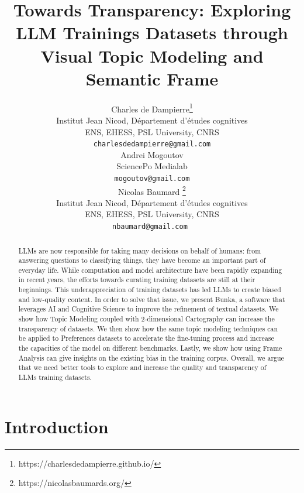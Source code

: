 \documentclass{article}
\title{Towards Transparency: Exploring LLM Trainings Datasets through Visual Topic Modeling and Semantic Frame}
\author{%
  Charles de Dampierre\thanks{https://charlesdedampierre.github.io/} \\
  Institut Jean Nicod, Département d’études cognitives\\
  ENS, EHESS, PSL University, CNRS\\
  \texttt{charlesdedampierre@gmail.com} \\
  \And
Andrei Mogoutov\\
 SciencePo Medialab\\
  \texttt{mogoutov@gmail.com} \\
  \AND
 Nicolas Baumard
\thanks{https://nicolasbaumards.org/} \\
  Institut Jean Nicod, Département d’études cognitives\\
  ENS, EHESS, PSL University, CNRS\\
  \texttt{nbaumard@gmail.com
} \\
}
\begin{document}
\maketitle


\begin{abstract}
LLMs are now responsible for taking many decisions on behalf of humans: from answering questions to classifying things, they have become an important part of everyday life. While computation and model architecture have been rapidly expanding in recent years, the efforts towards curating training datasets are still at their beginnings. This underappreciation of training datasets has led LLMs to create biased and low-quality content. In order to solve that issue, we present Bunka, a software that leverages AI and Cognitive Science to improve the refinement of textual datasets. We show how Topic Modeling coupled with 2-dimensional Cartography can increase the transparency of datasets. We then show how the same topic modeling techniques can be applied to Preferences datasets to accelerate the fine-tuning process and increase the capacities of the model on different benchmarks. Lastly, we show how using Frame Analysis can give insights on the existing bias in the training corpus. Overall, we argue that we need better tools to explore and increase the quality and transparency of LLMs training datasets.

\end{abstract}

\section{Introduction}
\end{document}
